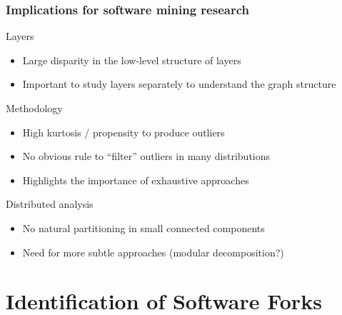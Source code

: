 \documentclass[aspectratio=169,xcolor=table]{beamer}
\begin{document}
    \begin{frame}
        \frametitle{Implications for software mining research}

        \begin{block}{Layers}
            \begin{itemize}
                \item Large disparity in the low-level structure of layers
                \item Important to study layers separately to understand
                    the graph structure
            \end{itemize}
        \end{block}

        \begin{block}{Methodology}
            \begin{itemize}
                \item High kurtosis / propensity to produce outliers
                \item No obvious rule to ``filter'' outliers in many
                    distributions
                \item Highlights the importance of exhaustive approaches
            \end{itemize}
        \end{block}

        \begin{block}{Distributed analysis}
            \begin{itemize}
                \item No natural partitioning in small connected components
                \item Need for more subtle approaches (modular decomposition?)
            \end{itemize}
        \end{block}
    \end{frame}

    \section{Identification of Software Forks}
\end{document}
